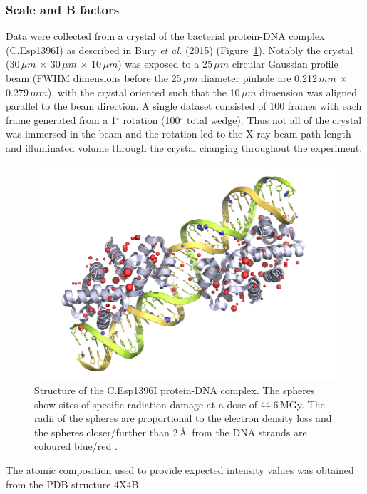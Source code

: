 \subsubsection{Scale and B factors}
\label{subs:Scale and B factors - C.Esp1396I}
Data were collected from a crystal of the bacterial protein-DNA complex (C.Esp1396I) as described in Bury \textit{et al.} (2015) (Figure~\ref{fig:C.Esp1396I structure}).
Notably the crystal (30$\,\mu m$ $\times$ 30$\,\mu m$ $\times$ 10$\,\mu m$) was exposed to a 25$\,\mu m$ circular Gaussian profile beam (FWHM dimensions before the 25$\,\mu m$ diameter pinhole are 0.212$\,mm$ $\times$ 0.279$\,mm$), with the crystal oriented such that the 10$\,\mu m$ dimension was aligned parallel to the beam direction.
A single dataset consisted of 100 frames with each frame generated from a 1$^{\circ}$ rotation (100$^{\circ}$ total wedge).
Thus not all of the crystal was immersed in the beam and the rotation led to the X-ray beam path length and illuminated volume through the crystal changing throughout the experiment.
\begin{figure}[ht!]
    \centering
    \includegraphics[width=1.0\textwidth]{figures/datared/JSRcoverpic_nobackground.png}
    \caption[Structure of the C.Esp1396I protein-DNA complex.]{Structure of the C.Esp1396I protein-DNA complex.
    The spheres show sites of specific radiation damage at a dose of 44.6$\,$MGy.
    The radii of the spheres are proportional to the electron density loss and the spheres closer/further than 2$\,$\AA\ from the DNA strands are coloured blue/red \cite{bury2015radiation}.}
    \label{fig:C.Esp1396I structure}
\end{figure}
The atomic composition used to provide expected intensity values was obtained from the PDB structure 4X4B.
